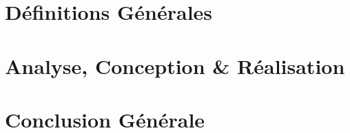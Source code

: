 \documentclass[11pt,a4paper,onecolumn,openright,oneside]{report}
\begin{document}
	\part{Définitions Générales}
		
		

	\part{Analyse, Conception \& Réalisation}
		
		

	\part{Conclusion Générale}
		

	\leftskip=0cm
	\renewcommand{\bibname}{Référence bibliographique et webographique}
	
	
	
\end{document}

